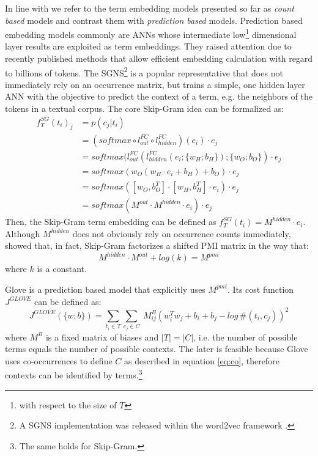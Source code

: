 In line with \textcite{levy_improving_2015} we refer to the term embedding models presented so far as \textit{count based} models and contrast them with \textit{prediction based} models. Prediction based embedding models commonly are \ac{ANN}s whose intermediate low\footnote{with respect to the size of $T$} dimensional layer results  are exploited as term embeddings. They raised attention due to recently published methods that allow efficient embedding calculation with regard to billions of tokens. The \ac{SGNS}\footnote{A \ac{SGNS} implementation was released within the word2vec framework \autocite{mikolov_efficient_2013}.} \autocite{mikolov_distributed_2013} is a popular representative  that does not immediately rely on an occurrence matrix, but trains a simple, one hidden layer \acs{ANN} with the objective to predict the context of a term, e.g. the neighbors of the tokens in a textual corpus. The core Skip-Gram idea can be formalized as:
\begin{equation}
\begin{split}
f^{SG}_T(t_i)_j & = p(c_j|t_i) \\
  & = (softmax \circ l^{FC}_{out} \circ l^{FC}_{hidden})(e_i) \cdot e_j \\
  & = softmax(l^{FC}_{out}(l^{FC}_{hidden}(e_i; \{w_{H};b_{H}\}); \{w_{O};b_{O}\}) \cdot e_j \\
  & = softmax(w_{O}(w_{H} \cdot e_i + b_{H}) + b_{O}) \cdot e_j \\
  & = softmax([w_{O},b^T_{O}] \cdot [w_{H},b^T_{H}]\cdot e_i) 
  \cdot e_j \\
  & = softmax(M^{out} \cdot M^{hidden} \cdot e_i) \cdot e_j
\end{split}
\end{equation}
Then, the Skip-Gram term embedding can be defined as $f_T^{SG}(t_i) = M^{hidden} \cdot e_i$. Although $M^{hidden}$ does not obviously rely on occurrence counts immediately, \textcite{levy_neural_2014} showed that, in fact, Skip-Gram factorizes a shifted \ac{PMI} matrix in the way that: 
\begin{equation}
M^{hidden} \cdot M^{out} + log(k) = M^{pmi}
\end{equation}
where $k$ is a constant. 

Glove \autocite{pennington_glove_2014} is a prediction based model that explicitly uses $M^{pmi}$. Its cost function  $J^{GLOVE}$ can be defined as:
\begin{equation}
J^{GLOVE}(\{w; b\}) = \sum\limits_{t_i \in T}\sum\limits_{c_j \in C}\ M^{B}_{ij}(w_i^Tw_j + b_i + b_j - log\,\#(t_i,c_j))^2
\end{equation}
where $M^B$ is a fixed matrix of biases and $|T| = |C|$, i.e. the number of possible terms equals the number of possible contexts. The later is feasible because Glove uses co-occurrences to define $C$ as described in equation \eqref{eq:co}, therefore contexts can be identified by terms.\footnote{The same holds for Skip-Gram.}

